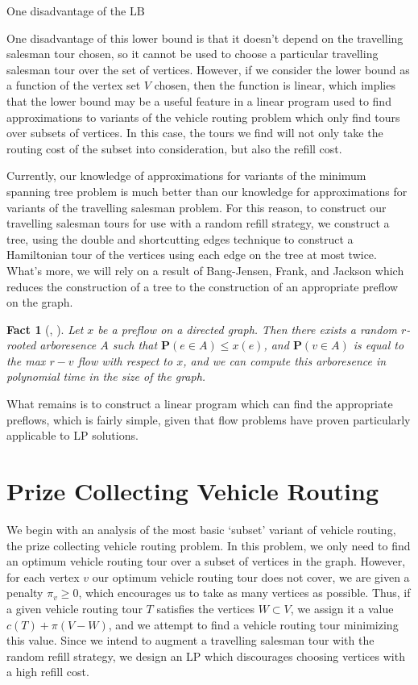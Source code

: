 \documentclass{article}
\theoremstyle{plain}
\newtheorem{fact}{Fact}
\theoremstyle{plain}
\begin{document}
One disadvantage of the $\text{LB}$


 One disadvantage of this lower bound is that it doesn't depend on the travelling salesman tour chosen, so it cannot be used to choose a particular travelling salesman tour over the set of vertices. However, if we consider the lower bound as a function of the vertex set $V$ chosen, then the function is linear, which implies that the lower bound may be a useful feature in a linear program used to find approximations to variants of the vehicle routing problem which only find tours over subsets of vertices. In this case, the tours we find will not only take the routing cost of the subset into consideration, but also the refill cost.

Currently, our knowledge of approximations for variants of the minimum spanning tree problem is much better than our knowledge for approximations for variants of the travelling salesman problem. For this reason, to construct our travelling salesman tours for use with a random refill strategy, we construct a tree, using the double and shortcutting edges technique to construct a Hamiltonian tour of the vertices using each edge on the tree at most twice. What's more, we will rely on a result of Bang-Jensen, Frank, and Jackson which reduces the construction of a tree to the construction of an appropriate preflow on the graph.

\begin{fact}[\cite{FlowToTreeResult}, \cite{FlowToTreePolyTimeResult}]
    Let $x$ be a preflow on a directed graph. Then there exists a random $r$-rooted arboresence $A$ such that $\mathbf{P}(e \in A) \leq x(e)$, and $\mathbf{P}(v \in A)$ is equal to the max $r-v$ flow with respect to $x$, and we can compute this arboresence in polynomial time in the size of the graph.
\end{fact}

What remains is to construct a linear program which can find the appropriate preflows, which is fairly simple, given that flow problems have proven particularly applicable to LP solutions.

\section{Prize Collecting Vehicle Routing}

We begin with an analysis of the most basic `subset' variant of vehicle routing, the prize collecting vehicle routing problem. In this problem, we only need to find an optimum vehicle routing tour over a subset of vertices in the graph. However, for each vertex $v$ our optimum vehicle routing tour does not cover, we are given a penalty $\pi_v \geq 0$, which encourages us to take as many vertices as possible. Thus, if a given vehicle routing tour $T$ satisfies the vertices $W \subset V$, we assign it a value $c(T) + \pi(V - W)$, and we attempt to find a vehicle routing tour minimizing this value. Since we intend to augment a travelling salesman tour with the random refill strategy, we design an LP which discourages choosing vertices with a high refill cost.
\end{document}
